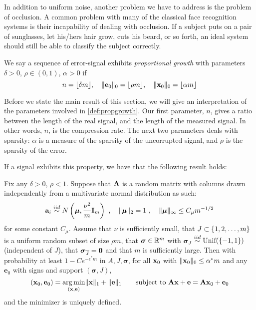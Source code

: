 In addition to uniform noise, another problem we have to address is the problem of occlusion. A common problem with many of the classical face recognition systems is their incapability of dealing with occlusion. If a subject puts on a pair of sunglasses, let his/hers hair grow, cuts his beard, or so forth, an ideal system should still be able to classify the subject correctly.


\begin{definition}
	\label{def:propgrowth}
	We say a sequence of error-signal exhibits \textit{proportional growth} with parameters $ \delta > 0 $, $ \rho \in (0,1) $, $ \alpha > 0 $ if	
	\[
		n = \lfloor \delta m \rfloor,\quad \lVert\mathbf{e}_{0}\rVert_{0} = \lfloor \rho m \rfloor, \quad \lVert\mathbf{x}_{0}\rVert_{0} = \lfloor \alpha m \rfloor
	\]
\end{definition}

Before we state the main result of this section, we will give an interpretation of the parameters involved in \cref{def:propgrowth}. Our first parameter, $ n $, gives a ratio between the length of the real signal, and the length of the measured signal. In other words, $ n $, is the compression rate. The next two parameters deals with sparsity: $ \alpha $ is a measure of the sparsity of the uncorrupted signal, and $ \rho $ is the sparsity of the error. 

If a signal exhibits this property, we have that the following result holds:

\begin{theorem}
	\label{thm:errorcorr}
	Fix any $ \delta>0 $, $ \rho<1 $. Suppose that $ \mathbf{A} $ is a random matrix with columns drawn independently from a multivariate normal distribution as such:
	\[
		\mathbf{a}_{i} \stackrel{iid}{\sim} N\left(\boldsymbol{\mu}, \frac{\nu^{2}}{m}\mathbf{I}_{m}\right)~, \quad \lVert\boldsymbol{\mu}\rVert_{2} = 1~, \quad \lVert\boldsymbol{\mu}\rVert_{\infty} \leq C_{\mu}m^{-1/2}
	\]
	for some constant $ C_{\mu} $. Assume that $ \nu $ is sufficiently small, that $ J \subset \{1, 2, \ldots, m\} $ is a uniform random subset of size $ \rho m $, that $ \boldsymbol{\sigma} \in \mathbb{R}^{m} $ with $ \boldsymbol{\sigma}_{J} $ $ \stackrel{iid}{\sim} \text{Unif}(\{-1, 1\}) $ (independent of $ J $), that $ \boldsymbol{\sigma}_{\overline{J}} = \mathbf{0} $ and that $ m $ is sufficiently large. Then with probability at least $ 1 - C e^{-\epsilon^{*}m} $ in $ A, J, \boldsymbol{\sigma} $, for all $ \mathbf{x}_{0} $ with $ \lVert\mathbf{x}_{0}\rVert_{0} \leq \alpha^{*}m $ and any $ \mathbf{e}_{0} $ with signs and support $ (\boldsymbol{\sigma}, J) $, 
	\begin{equation}
		\label{eq:errorcorr}
		(\mathbf{x}_{0}, \mathbf{e}_{0}) = \operatorname*{arg\,min}_{(\mathbf{x},\mathbf{e})} \lVert\mathbf{x}\rVert_{1} + \lVert\mathbf{e}\rVert_{1} \quad\quad\text{subject to}~ \mathbf{A}\mathbf{x} + \mathbf{e} = \mathbf{A}\mathbf{x}_{0} + \mathbf{e}_{0}
	\end{equation}
	and the minimizer is uniquely defined.
\end{theorem}

